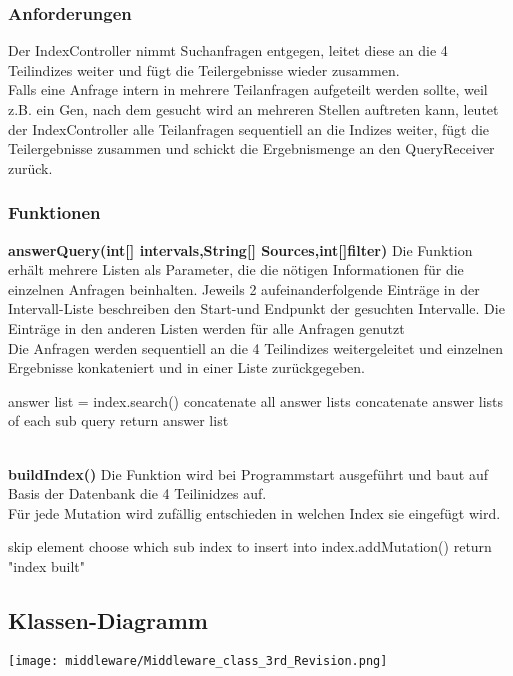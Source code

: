 \documentclass{scrartcl}
\begin{document}
\subsubsection{Anforderungen}
Der IndexController nimmt Suchanfragen entgegen, leitet diese an die 4 Teilindizes weiter und fügt die Teilergebnisse wieder zusammen.\\Falls eine Anfrage intern in mehrere Teilanfragen aufgeteilt werden sollte, weil z.B. ein Gen, nach dem gesucht wird an mehreren Stellen auftreten kann, leutet der IndexController alle Teilanfragen sequentiell an die Indizes weiter, fügt die Teilergebnisse zusammen und schickt die Ergebnismenge an den QueryReceiver zurück.
\subsubsection{Funktionen}
\textbf{answerQuery(int[] intervals,String[] Sources,int[]filter)}
Die Funktion erhält mehrere Listen als Parameter, die die nötigen Informationen für die einzelnen Anfragen beinhalten. Jeweils 2 aufeinanderfolgende Einträge in der Intervall-Liste beschreiben den Start-und Endpunkt der gesuchten Intervalle. Die Einträge in den anderen Listen werden für alle Anfragen genutzt\\
Die Anfragen werden sequentiell an die 4 Teilindizes weitergeleitet und einzelnen Ergebnisse konkateniert und in einer Liste zurückgegeben.
\begin{algorithm}
{
{answer list = index.search()\;}
concatenate all answer lists\;
}
concatenate answer lists of each sub query\;
return answer list\;
\end{algorithm}
\\
\textbf{buildIndex()}
Die Funktion wird bei Programmstart ausgeführt und baut auf Basis der Datenbank die 4 Teilinidzes auf.\\
Für jede Mutation wird zufällig entschieden in welchen Index sie eingefügt wird.\\
\begin{algorithm}
{
{skip element\;}
choose which sub index to insert into\;
index.addMutation()\;
}
return "index built"\;
\end{algorithm}

\newpage
\subsection{Klassen-Diagramm}
\texttt{[image: middleware/Middleware\_class\_3rd\_Revision.png]}
\end{document}
